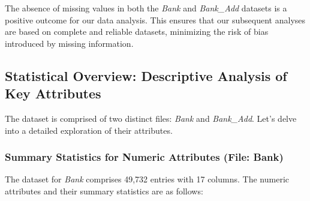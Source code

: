 \documentclass{article}
\begin{document}
The absence of missing values in both the \textit{Bank} and \textit{Bank\_Add} datasets is a positive outcome for our data analysis. This ensures that our subsequent analyses are based on complete and reliable datasets, minimizing the risk of bias introduced by missing information.


\subsection{Statistical Overview: Descriptive Analysis of Key Attributes}
The dataset is comprised of two distinct files: \textit{Bank} and \textit{Bank\_Add}. Let's delve into a detailed exploration of their attributes.

\subsubsection{Summary Statistics for Numeric Attributes (File: Bank)}

The dataset for \textit{Bank} comprises 49,732 entries with 17 columns. The numeric attributes and their summary statistics are as follows:\\  \\
\end{document}
